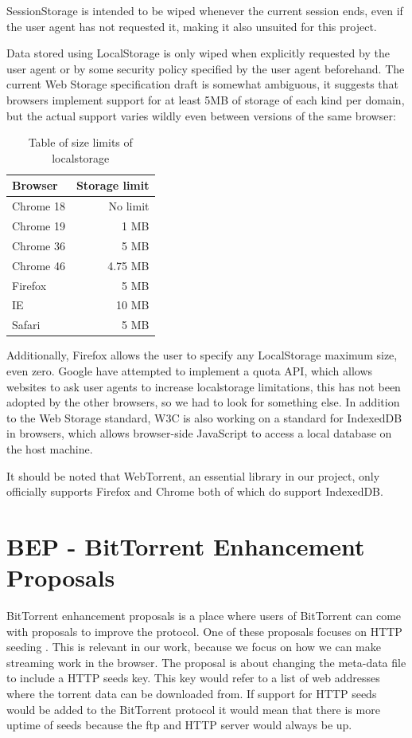 SessionStorage is intended to be wiped whenever the current session ends, 
even if the user agent has not requested it, making it also unsuited for this project.

Data stored using LocalStorage is only wiped when explicitly requested by the user agent or 
by some security policy specified by the user agent beforehand.
\newline\newline
The current Web Storage specification draft is somewhat ambiguous, 
it suggests that browsers implement support for at least 5MB of storage of each kind per domain,
but the actual support varies wildly even between versions of the same browser:

\begin{table}[h]
	\centering
	\begin{tabular}{l | r}
        Browser   & Storage limit \\ \hline
		Chrome 18 & No limit  \\
		Chrome 19 & 1    MB   \\
		Chrome 36 & 5    MB   \\
		Chrome 46 & 4.75 MB   \\
		Firefox   & 5    MB   \\
		IE        & 10   MB   \\
		Safari    & 5    MB   \\
	\end{tabular}
	\caption{Table of size limits of localstorage}
	\label{table:browserls}
\end{table}

Additionally, Firefox allows the user to specify any LocalStorage maximum size, even zero. 
Google have attempted to implement a quota \acs{API}, 
which allows websites to ask user agents to increase localstorage limitations,
this has not been adopted by the other browsers, so we had to look for something else.
\newline\newline
In addition to the Web Storage standard, W3C is also working on a standard for IndexedDB in browsers, 
which allows browser-side JavaScript to access a local database on the host machine.

It should be noted that WebTorrent, 
an essential library in our project, 
only officially supports Firefox and Chrome 
both of which do support IndexedDB.

\section{BEP - BitTorrent Enhancement Proposals}
BitTorrent enhancement proposals is a place where users of BitTorrent can come with proposals to improve the protocol.
One of these proposals focuses on \acs{HTTP} seeding \citep{bittorrent:bep17}.
This is relevant in our work, because we focus on how we can make streaming work in the browser. The proposal is about changing the meta-data file to include a \acs{HTTP} seeds key. This key would refer to a list of web addresses where the torrent data can be downloaded from.
If support for \acs{HTTP} seeds would be added to the BitTorrent protocol it would mean that there is more uptime of seeds because the ftp and \acs{HTTP} server would always be up.

